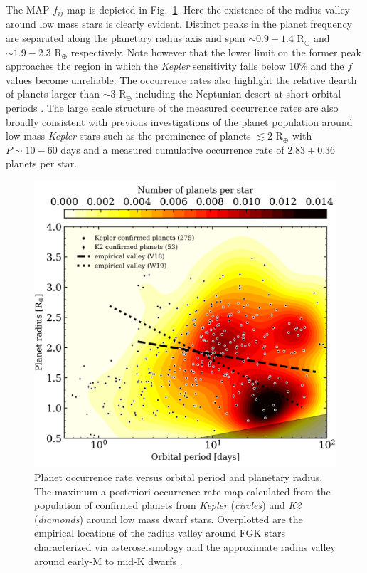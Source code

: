 \documentclass[twocolumn]{emulateapj}
\newcommand{\kepler}[1]{\emph{Kepler}#1}
\newcommand{\ktwo}[1]{\emph{K2}#1}
\begin{document}
The MAP $f_{ij}$ map is depicted in Fig.~\ref{fig:fmap}.
Here the existence of the radius valley around low mass stars is clearly
evident. Distinct peaks in the planet frequency are separated along the planetary radius axis and span
$\sim 0.9-1.4$ R$_{\oplus}$ and $\sim 1.9-2.3$ R$_{\oplus}$ respectively.
Note however that the lower limit on the former peak 
approaches the region in which the \kepler{} sensitivity falls below 10\% and the $f$ values become
unreliable.
The occurrence rates also highlight the relative dearth of planets larger than $\sim 3$ R$_{\oplus}$
including the Neptunian desert at short orbital periods \citep{lundkvist16,mazeh16}. The large scale
structure of the measured occurrence rates are also broadly consistent with previous investigations
of the planet population around low mass \kepler{} stars \citep{morton14,dressing15a,gaidos16} such
as the prominence of planets $\lesssim 2$ R$_{\oplus}$ with $P \sim 10-60$ days and a measured cumulative
occurrence rate of $2.83\pm 0.36$ planets per star.

\begin{figure}
  \centering
  \includegraphics[width=.7\hsize]{figures/fmap_Msgt0d0_xbin39_ybin26.png}
  \caption{Planet occurrence rate versus orbital period and planetary radius. The maximum a-posteriori occurrence
    rate map calculated from the population of confirmed planets from \kepler{} (\emph{circles}) and
    \ktwo{} (\emph{diamonds}) around low mass dwarf
    stars. Overplotted are the empirical locations of the radius valley around FGK stars 
    characterized via asteroseismology \citep[\emph{dashed line},][]{vaneylen18} and the approximate radius
    valley around early-M to mid-K dwarfs \citep[\emph{dotted line},][]{wu19}.}
  \label{fig:fmap}
\end{figure}
\end{document}
